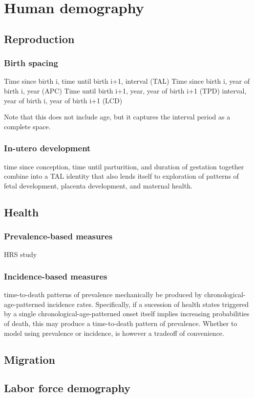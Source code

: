 \documentclass[11pt,oneside]{article} %
\begin{document}
\section{Human demography}
	\subsection{Reproduction}
		\subsubsection{Birth spacing}
		Time since birth i, time until birth i+1, interval (TAL)
		Time since birth i, year of birth i, year (APC)
		Time until birth i+1, year, year of birth i+1 (TPD)
		interval, year of birth i, year of birth i+1 (LCD)
		
		Note that this does not include age, but it captures the interval period as a
		complete space.
		\subsubsection{In-utero development}
		time since conception, time until parturition, and duration of gestation
		together combine into a TAL identity that also lends itself to exploration of
		patterns of fetal development, placenta development, and maternal health.
	\subsection{Health}
		\subsubsection{Prevalence-based measures}
		HRS study
		\subsubsection{Incidence-based measures}
		time-to-death patterns of prevalence mechanically be produced by
		chronological-age-patterned incidence rates. Specifically, if a sucession of
		health states triggered by a single chronological-age-patterned onset itself
		implies increasing probabilities of death, this may produce a time-to-death
		pattern of prevalence. Whether to model using prevalence or incidence, is
		however a tradeoff of convenience.
	\subsection{Migration}
	\subsection{Labor force demography}
\end{document}
